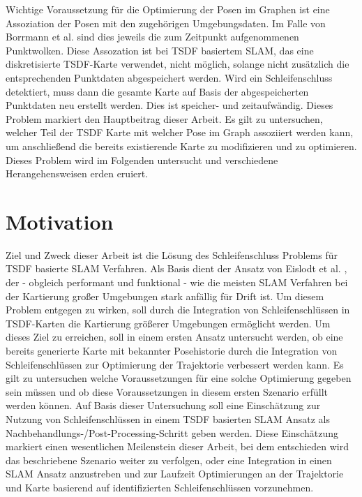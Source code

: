 Wichtige Voraussetzung für die Optimierung der Posen im Graphen ist eine Assoziation der Posen mit den zugehörigen Umgebungsdaten. Im Falle von Borrmann et al. \cite{borrmann2008globally} sind dies jeweils die zum Zeitpunkt aufgenommenen Punktwolken. Diese Assozation ist bei TSDF basiertem SLAM, das eine diskretisierte TSDF-Karte verwendet, nicht möglich, solange nicht zusätzlich die entsprechenden Punktdaten abgespeichert werden.
Wird ein Schleifenschluss detektiert, muss dann die gesamte Karte auf Basis der abgespeicherten Punktdaten neu erstellt werden. Dies ist speicher- und zeitaufwändig.
Dieses Problem markiert den Hauptbeitrag dieser Arbeit. Es gilt zu untersuchen, welcher Teil der TSDF Karte mit welcher Pose im Graph assoziiert werden kann, um anschließend die bereits existierende Karte zu modifizieren und zu optimieren.
Dieses Problem wird im Folgenden untersucht und verschiedene Herangehensweisen erden eruiert.


\section{Motivation}

Ziel und Zweck dieser Arbeit ist die Lösung des Schleifenschluss Problems für TSDF basierte SLAM Verfahren.
Als Basis dient der Ansatz von Eislodt et al. \cite{HATSDF}, der - obgleich performant und funktional - wie die meisten SLAM Verfahren bei der Kartierung großer Umgebungen stark anfällig für Drift ist. Um diesem Problem entgegen zu wirken, soll durch die Integration von Schleifenschlüssen in TSDF-Karten die Kartierung größerer Umgebungen ermöglicht werden.
Um dieses Ziel zu erreichen, soll in einem ersten Ansatz untersucht werden, ob eine bereits generierte Karte mit bekannter Posehistorie durch die Integration von Schleifenschlüssen zur Optimierung der Trajektorie verbessert werden kann.
Es gilt zu untersuchen welche Voraussetzungen für eine solche Optimierung gegeben sein müssen und ob diese Voraussetzungen in diesem ersten Szenario erfüllt werden können.
Auf Basis dieser Untersuchung soll eine Einschätzung zur Nutzung von Schleifenschlüssen in einem TSDF basierten SLAM Ansatz als Nachbehandlungs-/Post-Processing-Schritt geben werden.
Diese Einschätzung markiert einen wesentlichen Meilenstein dieser Arbeit, bei dem entschieden wird das beschriebene Szenario weiter zu verfolgen, oder eine Integration in einen SLAM Ansatz anzustreben und zur Laufzeit Optimierungen an der Trajektorie und Karte basierend auf identifizierten Schleifenschlüssen vorzunehmen.

